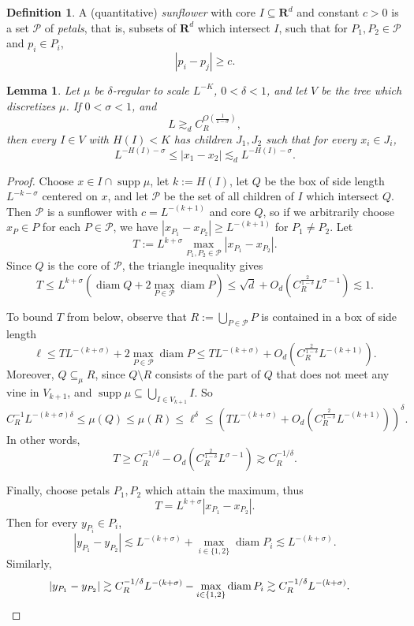 \documentclass[reqno,10pt]{amsart}
\newcommand{\RR}{\mathbf{R}}
\DeclareMathOperator{\diam}{diam}
\DeclareMathOperator{\supp}{supp}
\newcommand{\dfn}[1]{\emph{#1}\index{#1}}
\newtheorem{lemma}[theorem]{Lemma}
\theoremstyle{definition}
\newtheorem{definition}[theorem]{Definition}
\numberwithin{equation}{section}
\begin{document}
\begin{definition}
A (quantitative) \dfn{sunflower} with core $I \subseteq \RR^d$ and constant $c > 0$ is a set $\mathcal P$ of \dfn{petals}, that is, subsets of $\RR^d$ which intersect $I$, such that for $P_1, P_2 \in \mathcal P$ and $p_i \in P_i$,
$$|p_i - p_j| \geq c.$$
\end{definition}

\begin{lemma}\label{sigma is 23}
Let $\mu$ be $\delta$-regular to scale $L^{-K}$, $0 < \delta < 1$, and let $V$ be the tree which discretizes $\mu$.
If $0 < \sigma < 1$, and
\begin{equation}
L \gtrsim_d C_R^{O(\frac{1}{1 - \sigma})},
\end{equation}
then every $I \in V$ with $H(I) < K$ has children $J_1, J_2$ such that for every $x_i \in J_i$,
\begin{equation}
L^{-H(I)-\sigma} \leq |x_1 - x_2| \lesssim_d L^{-H(I)-\sigma}.
\end{equation}
\end{lemma}
\begin{proof}
Choose $x \in I \cap \supp \mu$, let $k := H(I)$, let $Q$ be the box of side length $L^{-k-\sigma}$ centered on $x$, and let $\mathcal P$ be the set of all children of $I$ which intersect $Q$.
Then $\mathcal P$ is a sunflower with $c = L^{-(k + 1)}$ and core $Q$, so if we arbitrarily choose $x_P \in P$ for each $P \in \mathcal P$, we have $|x_{P_1} - x_{P_2}| \geq L^{-(k + 1)}$ for $P_1 \neq P_2$.
Let 
$$T := L^{k + \sigma} \max_{P_1, P_2 \in \mathcal P} |x_{P_1} - x_{P_2}|.$$
Since $Q$ is the core of $\mathcal P$, the triangle inequality gives
$$T \leq L^{k + \sigma}\left(\diam Q + 2 \max_{P \in \mathcal P} \diam P\right) \leq \sqrt d + O_d(C_R^{\frac{2}{1 - \delta}} L^{\sigma - 1}) \lesssim 1.$$

To bound $T$ from below, observe that $R := \bigcup_{P \in \mathcal P} P$ is contained in a box of side length
$$\ell \leq TL^{-(k + \sigma)} + 2 \max_{P \in \mathcal P} \diam P \leq TL^{-(k + \sigma)} + O_d(C_R^{\frac{2}{1 - \delta}} L^{-(k + 1)}).$$
Moreover, $Q \subseteq_\mu R$, since $Q \setminus R$ consists of the part of $Q$ that does not meet any vine in $V_{k + 1}$, and $\supp \mu \subseteq \bigcup_{I \in V_{k + 1}} I$.
So
$$C_R^{-1} L^{-(k + \sigma)\delta} \leq \mu(Q) \leq \mu(R) \leq \ell^\delta \leq \left(TL^{-(k + \sigma)} + O_d(C_R^{\frac{2}{1 - \delta}} L^{-(k + 1)})\right)^\delta.$$
In other words,
$$T \geq C_R^{-1/\delta} - O_d(C_R^{\frac{2}{1 - \delta}} L^{\sigma - 1}) \gtrsim C_R^{-1/\delta}.$$

Finally, choose petals $P_1, P_2$ which attain the maximum, thus 
$$T = L^{k + \sigma} |x_{P_1} - x_{P_2}|.$$
Then for every $y_{P_i} \in P_i$,
$$|y_{P_1} - y_{P_2}| \lesssim L^{-(k + \sigma)} + \max_{i \in \{1, 2\}} \diam P_i \lesssim L^{-(k + \sigma)}.$$
Similarly,
\begin{align*}
|y_{P_1} - y_{P_2}| &\gtrsim C_R^{-1/\delta} L^{-(k + \sigma)} - \max_{i \in \{1, 2\}} \diam P_i \gtrsim C_R^{-1/\delta} L^{-(k + \sigma)}. \qedhere
\end{align*}
\end{proof}
\end{document}
